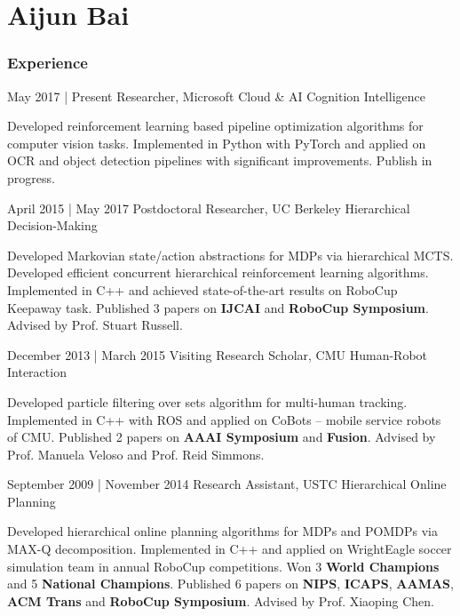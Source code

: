 \documentclass{tccv}
\begin{document}
\part{Aijun Bai}

\section{Experience}

\begin{eventlist}
	\item{May 2017 | Present}
	{Researcher, Microsoft Cloud \& AI}
	{Cognition Intelligence}
				
	Developed reinforcement learning based pipeline optimization algorithms for computer vision tasks. Implemented in Python with PyTorch and applied on OCR and object detection pipelines with significant improvements. Publish in progress.
		
	\item{April 2015 | May 2017}
	{Postdoctoral Researcher, UC Berkeley}
	{Hierarchical Decision-Making}
				
	Developed Markovian state/action abstractions for MDPs via hierarchical MCTS.  Developed efficient concurrent hierarchical reinforcement learning algorithms. Implemented in C++ and achieved state-of-the-art results on RoboCup Keepaway task. Published 3 papers on {\bf IJCAI} and {\bf RoboCup Symposium}. Advised by Prof. Stuart Russell.
													
	\item{December 2013 | March 2015}
	{Visiting Research Scholar, CMU}
	{Human-Robot Interaction}
				
	Developed particle filtering over sets algorithm for multi-human tracking. Implemented in C++ with ROS and applied on CoBots -- mobile service robots of CMU. Published 2 papers on {\bf AAAI Symposium} and {\bf Fusion}. Advised by Prof. Manuela Veloso and Prof. Reid Simmons. 
																																		
	\item{September 2009 | November 2014}
	{Research Assistant, USTC}
	{Hierarchical Online Planning}
				
	Developed hierarchical online planning algorithms for MDPs and POMDPs via MAX-Q decomposition. Implemented in C++ and applied on WrightEagle soccer simulation team in annual RoboCup competitions. Won 3 {\bf World Champions} and 5 {\bf National Champions}.  Published 6 papers on {\bf NIPS}, {\bf ICAPS}, {\bf AAMAS}, {\bf ACM Trans} and {\bf RoboCup  Symposium}. Advised by Prof. Xiaoping Chen.
\end{eventlist}
\end{document}
